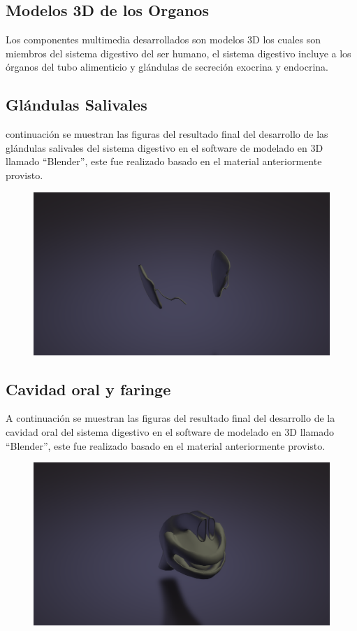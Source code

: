 \subsection{Modelos 3D de los Organos}
Los componentes multimedia desarrollados son modelos 3D los cuales son miembros del sistema digestivo del ser humano, 
el sistema digestivo incluye a los órganos del tubo alimenticio y glándulas de secreción exocrina y endocrina.\\

\subsection{Glándulas Salivales}
 continuación se muestran las figuras del resultado final del desarrollo de las glándulas salivales del sistema digestivo 
 en el software de modelado en 3D llamado “Blender”, este fue realizado basado en el material anteriormente provisto.\\
\begin{figure}[H]
	\begin{center}
 		\includegraphics[width = .5\textwidth]{source/images/image41.png}
	\end{center} 
\end{figure}

\subsection{Cavidad oral y faringe}
A continuación se muestran las figuras del resultado final del desarrollo de la cavidad oral del sistema digestivo en el software de modelado en 3D llamado “Blender”, este fue realizado basado en el material anteriormente provisto.\\
\begin{figure}[H]
	\begin{center}
 		\includegraphics[width = .5\textwidth]{source/images/image14.png}
	\end{center} 
\end{figure}

